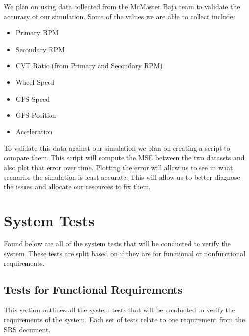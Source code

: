 \documentclass[12pt, titlepage]{article}
\begin{document}
\noindent We plan on using data collected from the McMaster Baja team to validate the accuracy of our simulation.
Some of the values we are able to collect include:
\begin{itemize}
  \item Primary RPM
  \item Secondary RPM
  \item CVT Ratio (from Primary and Secondary RPM)
  \item Wheel Speed
  \item GPS Speed
  \item GPS Position
  \item Acceleration
\end{itemize}

\noindent To validate this data against our simulation we plan on creating a script to compare them.
This script will compute the MSE between the two datasets and also plot that error over time.
Plotting the error will allow us to see in what scenarios the simulation is least accurate.
This will allow us to better diagnose the issues and allocate our resources to fix them.

\section{System Tests}


Found below are all of the system tests that will be conducted to verify the system.
These tests are split based on if they are for functional or nonfunctional requirements.

\subsection{Tests for Functional Requirements}



This section outlines all the system tests that will be conducted to verify the requirements of the system.
Each set of tests relate to one requirement from the SRS document.
\end{document}
